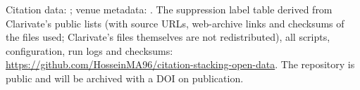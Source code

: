 Citation data: \citet{arjomandi2024dataset}; venue metadata: \citet{ocmeta2024dump}. The suppression label table
derived from Clarivate's public lists (with source URLs, web-archive links and checksums of the files used; Clarivate's
files themselves are not redistributed), all scripts, configuration, run logs and checksums:
\url{https://github.com/HosseinMA96/citation-stacking-open-data}. The repository is public and will be archived with a DOI on publication.
